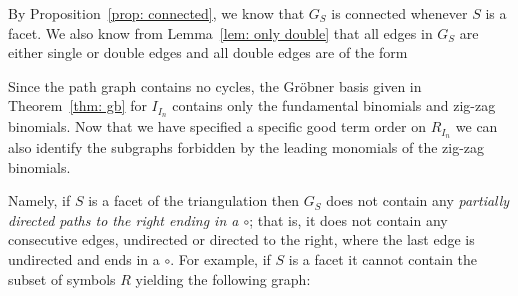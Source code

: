 \documentclass[11pt]{article}
\theoremstyle{definition}
\numberwithin{equation}{section}
\begin{document}
By Proposition~\ref{prop: connected}, we know that $G_S$ is connected whenever $S$ is a facet.  
We also know from Lemma~\ref{lem: only double} that all edges in $G_S$ are either single or double edges and all double edges are of the form
\begin{center}
    \end{center}
Since the path graph contains no cycles, the Gr\"obner basis given in Theorem~\ref{thm: gb} for $I_{I_{n}}$ contains only the fundamental binomials and zig-zag binomials. 
Now that we have specified a specific good term order on $R_{I_{n}}$ we can also identify the subgraphs forbidden by the leading monomials of the zig-zag binomials.

Namely, if $S$ is a facet of the triangulation then $G_S$ does not contain any \emph{partially directed paths to the right ending in a $\circ$}; that is, it does not contain any consecutive edges, undirected or directed to the right, where the last edge is undirected and ends in a $\circ$.  
For example, if $S$ is a facet it cannot contain the subset of symbols $R$ yielding the following graph:
\end{document}
